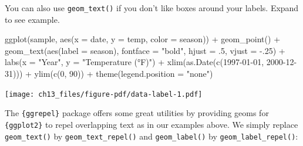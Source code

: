 \documentclass[
  letterpaper,
]{scrbook}
\newenvironment{Shaded}{\begin{snugshade}}{\end{snugshade}}
\newcommand{\AttributeTok}[1]{\textcolor[rgb]{0.40,0.45,0.13}{#1}}
\newcommand{\DecValTok}[1]{\textcolor[rgb]{0.68,0.00,0.00}{#1}}
\newcommand{\FunctionTok}[1]{\textcolor[rgb]{0.28,0.35,0.67}{#1}}
\newcommand{\NormalTok}[1]{\textcolor[rgb]{0.00,0.23,0.31}{#1}}
\newcommand{\SpecialCharTok}[1]{\textcolor[rgb]{0.37,0.37,0.37}{#1}}
\newcommand{\StringTok}[1]{\textcolor[rgb]{0.13,0.47,0.30}{#1}}
\begin{document}
\begin{tcolorbox}[enhanced jigsaw, rightrule=.15mm, arc=.35mm, title=\textcolor{quarto-callout-tip-color}{\faLightbulb}\hspace{0.5em}{Using \texttt{geom\_text()}}, colback=white, toptitle=1mm, colbacktitle=quarto-callout-tip-color!10!white, breakable, left=2mm, opacityback=0, leftrule=.75mm, bottomrule=.15mm, bottomtitle=1mm, colframe=quarto-callout-tip-color-frame, coltitle=black, toprule=.15mm, opacitybacktitle=0.6, titlerule=0mm]

You can also use \texttt{geom\_text()} if you don't like boxes around
your labels. Expand to see example.

\begin{Shaded}
\begin{Highlighting}[]
\FunctionTok{ggplot}\NormalTok{(sample, }\FunctionTok{aes}\NormalTok{(}\AttributeTok{x =}\NormalTok{ date, }\AttributeTok{y =}\NormalTok{ temp, }\AttributeTok{color =}\NormalTok{ season)) }\SpecialCharTok{+}
  \FunctionTok{geom\_point}\NormalTok{() }\SpecialCharTok{+}
  \FunctionTok{geom\_text}\NormalTok{(}\FunctionTok{aes}\NormalTok{(}\AttributeTok{label =}\NormalTok{ season), }\AttributeTok{fontface =} \StringTok{"bold"}\NormalTok{,}
            \AttributeTok{hjust =}\NormalTok{ .}\DecValTok{5}\NormalTok{, }\AttributeTok{vjust =} \SpecialCharTok{{-}}\NormalTok{.}\DecValTok{25}\NormalTok{) }\SpecialCharTok{+}
  \FunctionTok{labs}\NormalTok{(}\AttributeTok{x =} \StringTok{"Year"}\NormalTok{, }\AttributeTok{y =} \StringTok{"Temperature (°F)"}\NormalTok{) }\SpecialCharTok{+}
  \FunctionTok{xlim}\NormalTok{(}\FunctionTok{as.Date}\NormalTok{(}\FunctionTok{c}\NormalTok{(}\StringTok{\textquotesingle{}1997{-}01{-}01\textquotesingle{}}\NormalTok{, }\StringTok{\textquotesingle{}2000{-}12{-}31\textquotesingle{}}\NormalTok{))) }\SpecialCharTok{+}
  \FunctionTok{ylim}\NormalTok{(}\FunctionTok{c}\NormalTok{(}\DecValTok{0}\NormalTok{, }\DecValTok{90}\NormalTok{)) }\SpecialCharTok{+}
  \FunctionTok{theme}\NormalTok{(}\AttributeTok{legend.position =} \StringTok{"none"}\NormalTok{)}
\end{Highlighting}
\end{Shaded}

\texttt{[image: ch13\_files/figure-pdf/data-label-1.pdf]}

\end{tcolorbox}

The \texttt{\{ggrepel\}} package offers some great utilities by
providing geoms for \texttt{\{ggplot2\}} to repel overlapping text as in
our examples above. We simply replace \texttt{geom\_text()} by
\texttt{geom\_text\_repel()} and \texttt{geom\_label()} by
\texttt{geom\_label\_repel()}:
\end{document}
